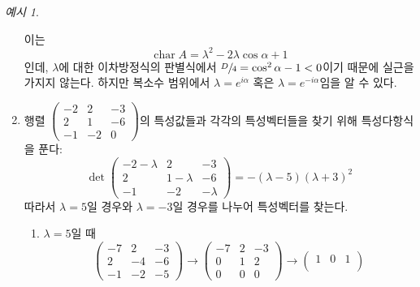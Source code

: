 \documentclass[unfonts,oneside,a4paper]{oblivoir}
\theoremstyle{definition}
\theoremstyle{theorem}
\theoremstyle{theorem}
\theoremstyle{remark}
\theoremstyle{remark}
\theoremstyle{remark}
\newtheorem*{example}{예시}
\theoremstyle{remark}
\DeclareMathOperator{\Char}{char}
\begin{document}
\begin{example}
\begin{enumerate}
            이는
            \begin{equation*}
                \Char A = \lambda^2 - 2 \lambda \cos \alpha + 1
            \end{equation*}
            인데, $\lambda$에 대한 이차방정식의 판별식에서 $\sfrac D4 = \cos^2 \alpha - 1 < 0$이기 때문에 실근을 가지지 않는다.
            하지만 복소수 범위에서 $\lambda = e^{i \alpha}$ 혹은 $\lambda = e^{-i \alpha}$임을 알 수 있다.
        \item 행렬  $\begin{pmatrix}-2 & 2 & -3\\2 & 1 & -6\\-1 & -2 & 0\end{pmatrix}$의 특성값들과 각각의 특성벡터들을 찾기 위해 특성다항식을 푼다:
            \begin{equation*}
                \det
                \begin{pmatrix}
                    -2 - \lambda & 2 & -3\\
                    2 & 1 - \lambda & -6\\
                    -1 & -2 & -\lambda
                \end{pmatrix}
                = - (\lambda - 5)(\lambda + 3)^2
            \end{equation*}
            따라서 $\lambda = 5$일 경우와 $\lambda = -3$일 경우를 나누어 특성벡터를 찾는다.
            \begin{enumerate}
                \item $\lambda = 5$일 때
                    \begin{equation*}
                        \begin{pmatrix}
                            -7 & 2 & -3\\
                            2 & -4 & -6\\
                            -1 & -2 & -5
                        \end{pmatrix}
                        \rightarrow
                        \begin{pmatrix}
                            -7 & 2 & -3\\
                            0 & 1 & 2\\
                            0 & 0 & 0
                        \end{pmatrix}
                        \rightarrow
                        \begin{pmatrix}
                            1 & 0 & 1\\

\end{pmatrix}
\end{equation*}
\end{enumerate}
\end{enumerate}
\end{example}
\end{document}
